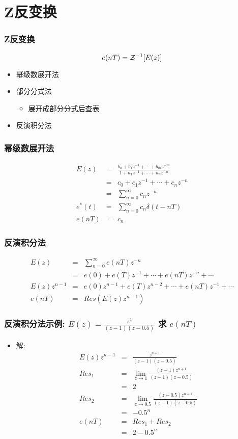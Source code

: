 \documentclass[table]{beamer}
\begin{document}
\section{Z反变换}
\label{sec-2}
\begin{frame}
\frametitle{Z反变换}
\label{sec-2-1}

 \[e(nT)={\cal Z}^{-1}[E(z)]\]
\begin{itemize}
\item 幂级数展开法
\item 部分分式法
\begin{itemize}
\item 展开成部分分式后查表
\end{itemize}
\item 反演积分法
\end{itemize}
\end{frame}
\begin{frame}
\frametitle{幂级数展开法}
\label{sec-2-2}

\begin{eqnarray*}
E(z) & = &\frac{b_0+b_1 z^{-1}+\cdots+b_m z^{-m}}{1+a_1 z^{-1}+\cdots+a_n z^{-n}} \\
 &=& c_0+c_1 z^{-1}+\cdots +c_n z^{-n} \\
 &=& \sum_{n=0}^{\infty}c_n z^{-n} \\
e^{*}(t) &=& \sum_{n=0}^{\infty}c_n\delta(t-nT) \\
e(nT) &=& c_n 
\end{eqnarray*}
\end{frame}
\begin{frame}
\frametitle{反演积分法}
\label{sec-2-3}

\begin{eqnarray*}
E(z) & = & \sum_{n=0}^{\infty}e(nT)z^{-n} \\
  &=& e(0)+e(T)z^{-1}+\cdots+e(nT)z^{-n}+\cdots \\
E(z)z^{n-1} &=& e(0)z^{n-1}+e(T)z^{n-2}+\cdots+e(nT)z^{-1}+\cdots \\
e(nT)&=& Res(E(z)z^{n-1})
\end{eqnarray*}
\end{frame}
\begin{frame}
\frametitle{反演积分法示例:  $E(z)=\frac{z^2}{(z-1)(z-0.5)}$  求  $e(nT)$}
\label{sec-2-4}

\begin{itemize}
\item <2->解:
     \begin{eqnarray*}
     E(z)z^{n-1} & = &\frac{z^{n+1}}{(z-1)(z-0.5)} \\
     Res_1 &=& \lim_{z\rightarrow 1}\frac{(z-1)z^{n+1}}{(z-1)(z-0.5)} \\
        &=& 2 \\
     Res_2 &=& \lim_{z\rightarrow 0.5}\frac{(z-0.5)z^{n+1}}{(z-1)(z-0.5)} \\
        &=& -0.5^n \\
     e(nT) &=& Res_1+Res_2 \\
      &=& 2-0.5^n
     \end{eqnarray*}
\end{itemize}
\end{frame}
\end{document}

